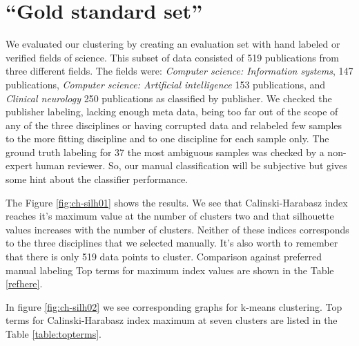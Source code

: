 \section{``Gold standard set''}
We evaluated our clustering by creating an evaluation set with
hand labeled or verified fields of science. This subset of data 
consisted of 519 publications from three different fields. The fields
were: \emph{Computer science: Information systems}, 147 publications,
\emph{Computer science: Artificial intelligence} 153 publications, 
and \emph{Clinical neurology} 250 publications as classified by 
publisher. We checked the publisher labeling,  lacking enough meta data, being too far out of the 
scope of any of the three disciplines or having corrupted data and
relabeled few  samples to the more fitting 
discipline and to one discipline for each sample only. The ground 
truth labeling for 37 the most ambiguous samples was checked by 
a non-expert human reviewer. So, our manual classification will
be subjective but gives some hint about the classifier performance.

The Figure \ref{fig:ch-silh01} shows the results. We see that
Calinski-Harabasz index reaches it's maximum value at the number
of clusters two and that silhouette values increases with the
number of clusters.
Neither of these indices corresponds to the three disciplines
that we selected manually. It's also worth to remember that there
is only 519 data points to cluster. Comparison against preferred
manual labeling 
Top terms for maximum index values are shown in the Table 
\ref{refhere}.

In figure \ref{fig:ch-silh02}
we see corresponding graphs for k-means clustering. Top terms for
Calinski-Harabasz index maximum at seven clusters are listed in 
the Table \ref{table:topterms}.


